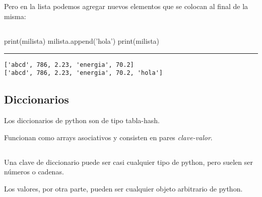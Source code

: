 \documentclass[]{article}
\newenvironment{Shaded}{}{}
\newcommand{\StringTok}[1]{\textcolor[rgb]{0.25,0.44,0.63}{#1}}
\newcommand{\BuiltInTok}[1]{#1}
\newcommand{\NormalTok}[1]{#1}
\begin{document}
\subsection{}\label{section-36}

Pero en la lista podemos agregar nuevos elementos que se colocan al
final de la misma:

\subsection{}\label{section-37}

\begin{Shaded}
\begin{Highlighting}[]
\BuiltInTok{print}\NormalTok{(milista)}
\NormalTok{milista.append(}\StringTok{'hola'}\NormalTok{)}
\BuiltInTok{print}\NormalTok{(milista)}
\end{Highlighting}
\end{Shaded}

\begin{center}\rule{0.5\linewidth}{\linethickness}\end{center}

\begin{verbatim}
['abcd', 786, 2.23, 'energia', 70.2]
['abcd', 786, 2.23, 'energia', 70.2, 'hola']
\end{verbatim}

\subsection{ Diccionarios}\label{diccionarios}

Los diccionarios de python son de tipo tabla-hash.

Funcionan como arrays asociativos y consisten en pares
\emph{clave-valor}.

\subsection{}\label{section-38}

Una clave de diccionario puede ser casi cualquier tipo de python, pero
suelen ser números o cadenas.

Los valores, por otra parte, pueden ser cualquier objeto arbitrario de
python.

\subsection{}\label{section-39}
\end{document}
